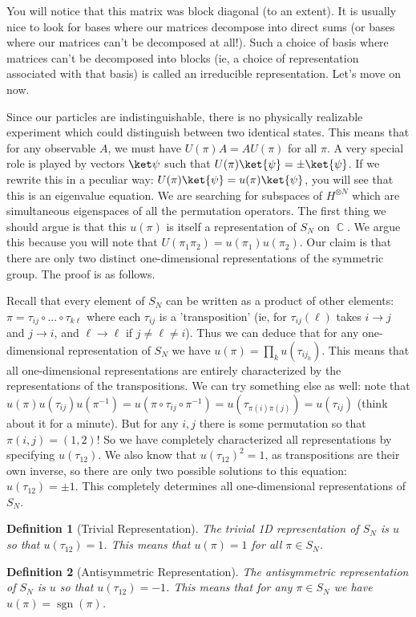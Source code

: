 \documentclass{article}
\DeclareMathOperator{\sgn}{\textrm{sgn}}
\DeclareMathOperator{\CC}{\mathbb{C}}
\newtheorem{defn}{Definition}
\begin{document}
You will notice that this matrix was block diagonal (to an extent). It is usually nice to look for bases where our matrices decompose into direct sums (or bases where our matrices can't be decomposed at all!). Such a choice of basis where matrices can't be decomposed into blocks (ie, a choice of representation associated with that basis) is called an irreducible representation. Let's move on now.

Since our particles are indistinguishable, there is no physically realizable experiment which could distinguish between two identical states. This means that for any observable $A$, we must have $U(\pi) A = A U(\pi)$ for all $\pi$. A very special role is played by vectors $\ket\psi$ such that $U(\pi) \ket{\psi} = \pm \ket{\psi}$. If we rewrite this in a peculiar way: $U(\pi)\ket{\psi} = u(\pi)\ket{\psi}$, you will see that this is an eigenvalue equation. We are searching for subspaces of $H^{\otimes N}$ which are simultaneous eigenspaces of all the permutation operators. The first thing we should argue is that this $u(\pi)$ is itself a representation of $S_N$ on $\CC$. We argue this because you will note that $U(\pi_1\pi_2) = u(\pi_1)u(\pi_2)$. Our claim is that there are only two distinct one-dimensional representations of the symmetric group. The proof is as follows.

Recall that every element of $S_N$ can be written as a product of other elements: $\pi = \tau_{ij} \circ ... \circ \tau_{k\ell}$ where each $\tau_{ij}$ is a 'transposition' (ie, for $\tau_{ij}(\ell)$ takes $i \to j$ and $j \to i$, and $\ell \to \ell$ if $j\neq \ell \neq i$). Thus we can deduce that for any one-dimensional representation of $S_N$ we have $u(\pi) = \prod_k u(\tau_{ij_k})$. This means that all one-dimensional representations are entirely characterized by the representations of the transpositions. We can try something else as well: note that $u(\pi)u(\tau_{ij})u(\pi^{-1}) = u(\pi\circ \tau_{ij}\circ \pi^{-1}) = u(\tau_{\pi(i)\pi(j)}) = u(\tau_{ij})$ (think about it for a minute). But for any $i,j$ there is some permutation so that $\pi(i,j) = (1,2)$! So we have completely characterized all representations by specifying $u(\tau_{12})$. We also know that $u(\tau_{12})^{2} = 1$, as transpositions are their own inverse, so there are only two possible solutions to this equation: $u(\tau_{12})=\pm1$. This completely determines all one-dimensional representations of $S_N$.
\begin{defn}[Trivial Representation]
The trivial 1D representation of $S_N$ is $u$ so that $u(\tau_{12}) = 1$. This means that $u(\pi) = 1$ for all $\pi \in S_N$.
\end{defn}
\begin{defn}[Antisymmetric Representation]
The antisymmetric representation of $S_N$ is $u$ so that $u(\tau_{12}) = -1$. This means that for any $\pi \in S_N$ we have $u(\pi) = \sgn(\pi)$.
\end{defn}
\end{document}
